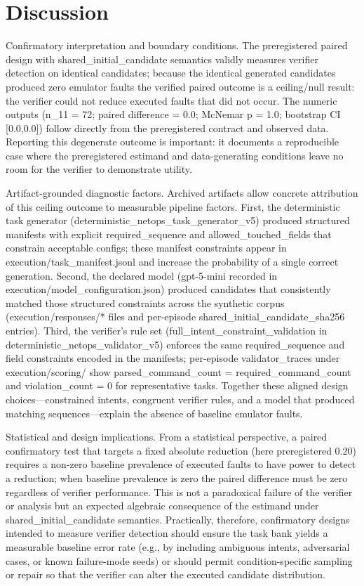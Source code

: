 \documentclass[conference]{IEEEtran}
\begin{document}
\section{Discussion}
Confirmatory interpretation and boundary conditions. The preregistered paired design with shared\_initial\_candidate semantics validly measures verifier detection on identical candidates; because the identical generated candidates produced zero emulator faults the verified paired outcome is a ceiling/null result: the verifier could not reduce executed faults that did not occur. The numeric outputs (n\_11 = 72; paired difference = 0.0; McNemar p = 1.0; bootstrap CI [0.0,0.0]) follow directly from the preregistered contract and observed data. Reporting this degenerate outcome is important: it documents a reproducible case where the preregistered estimand and data-generating conditions leave no room for the verifier to demonstrate utility.

Artifact-grounded diagnostic factors. Archived artifacts allow concrete attribution of this ceiling outcome to measurable pipeline factors. First, the deterministic task generator (deterministic\_netops\_task\_generator\_v5) produced structured manifests with explicit required\_sequence and allowed\_touched\_fields that constrain acceptable configs; these manifest constraints appear in execution/task\_manifest.jsonl and increase the probability of a single correct generation. Second, the declared model (gpt-5-mini recorded in execution/model\_configuration.json) produced candidates that consistently matched those structured constraints across the synthetic corpus (execution/responses/* files and per-episode shared\_initial\_candidate\_sha256 entries). Third, the verifier's rule set (full\_intent\_constraint\_validation in deterministic\_netops\_validator\_v5) enforces the same required\_sequence and field constraints encoded in the manifests; per-episode validator\_traces under execution/scoring/ show parsed\_command\_count = required\_command\_count and violation\_count = 0 for representative tasks. Together these aligned design choices---constrained intents, congruent verifier rules, and a model that produced matching sequences---explain the absence of baseline emulator faults.

Statistical and design implications. From a statistical perspective, a paired confirmatory test that targets a fixed absolute reduction (here preregistered 0.20) requires a non-zero baseline prevalence of executed faults to have power to detect a reduction; when baseline prevalence is zero the paired difference must be zero regardless of verifier performance. This is not a paradoxical failure of the verifier or analysis but an expected algebraic consequence of the estimand under shared\_initial\_candidate semantics. Practically, therefore, confirmatory designs intended to measure verifier detection should ensure the task bank yields a measurable baseline error rate (e.g., by including ambiguous intents, adversarial cases, or known failure-mode seeds) or should permit condition-specific sampling or repair so that the verifier can alter the executed candidate distribution.
\end{document}

